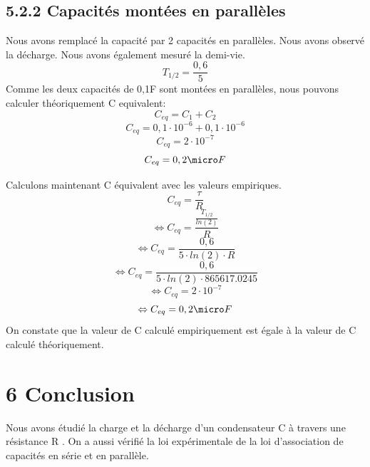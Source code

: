 \documentclass{report}
\begin{document}
\subsection*{5.2.2 Capacit\'es mont\'ees en parall\`eles}
\hspace*{0.5cm}
Nous avons remplac\'e la capacit\'e par 2 capacit\'es en parall\`eles. Nous avons observé la d\'echarge. Nous avons \'egalement mesur\'e la demi-vie.
\begin{equation}
   T_{1/2} = \frac{0,6}{5}
\end{equation}
Comme les deux capacit\'es de 0,1\micro F sont mont\'ees en parall\`eles, nous pouvons calculer th\'eoriquement C equivalent:
\begin{equation}
    C_{eq} = C_1 + C_2
\end{equation}
\begin{equation}
    C_{eq} = 0,1 \cdot 10^{-6} +  0,1 \cdot 10^{-6}
\end{equation}
\begin{equation}
    C_{eq} = 2 \cdot 10^{-7}
\end{equation}
\begin{equation}
    C_{eq} = 0,2 \micro F
\end{equation}

Calculons maintenant C \'equivalent avec les valeurs empiriques.
\begin{equation}
    C_{eq} = \frac{\tau}{R}
\end{equation}
\begin{equation}
    \Leftrightarrow C_{eq} = \frac{\frac{T_{1/2}}{ln(2)}}{R}
\end{equation}
\begin{equation}
    \Leftrightarrow C_{eq} = \frac{0,6}{5 \cdot ln(2) \cdot R}
\end{equation}
\begin{equation}
    \Leftrightarrow C_{eq} = \frac{0,6}{5 \cdot ln(2) \cdot 865617.0245}
\end{equation}
\begin{equation}
    \Leftrightarrow C_{eq} = 2 \cdot 10^{-7}
\end{equation}
\begin{equation}
    \Leftrightarrow C_{eq} = 0,2 \micro F
\end{equation}
On constate que la valeur de C calcul\'e empiriquement est \'egale \`a la valeur de C calcul\'e th\'eoriquement.

\section*{6 Conclusion}
\hspace*{0.5cm}
Nous avons \'etudi\'e la charge et la d\'echarge  d'un condensateur C \`a travers une r\'esistance R . On a aussi v\'erifi\'e la loi exp\'erimentale de la loi d'association de capacit\'es en s\'erie et en parall\`ele.\\
\end{document}
